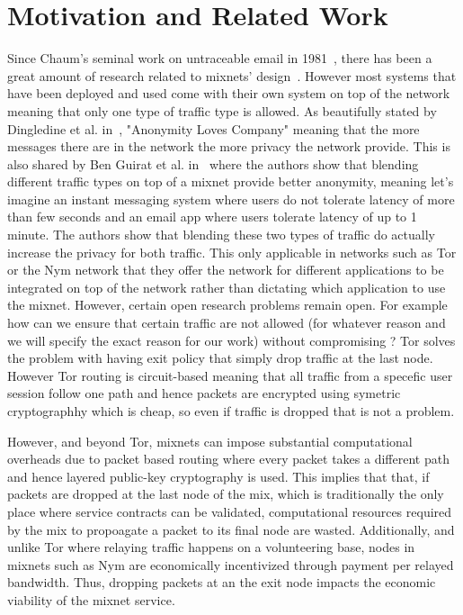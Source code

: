 \section{Motivation and Related Work}
\label{sec:related}

Since Chaum’s seminal work on untraceable email in 1981~\cite{chaum-mix}, there has been a great amount of research related to mixnets' design~\cite{piotrowska2017loopix, van2015vuvuzela, kwon2020xrd, lazar2018karaoke, cottrell1995mixmaster, alexopoulos2017MCMIX, chaum2016cmix, chaum-mix, danezis2003mixminion}. However most systems that have been deployed and used come with their own system on top of the network meaning that only one type of traffic type is allowed. As beautifully stated by Dingledine et al. in~\cite{dingledine2006anonymity}, "Anonymity Loves Company" meaning that the more messages there are in the network the more privacy the network provide. This is also shared by Ben Guirat et al. in~\cite{benguirat2023blending} where the authors show that blending different traffic types on top of a mixnet provide better anonymity, meaning let's imagine an instant messaging system where users do not tolerate latency of more than few seconds and an email app where users tolerate latency of up to 1 minute. The authors show that blending these two types of traffic do actually increase the privacy for both traffic. This only applicable in networks such as Tor or the Nym network that they offer the network for different applications to be integrated on top of the network rather than dictating which application to use the mixnet.
However, certain open research problems remain open. For example how can we ensure that certain traffic are not allowed (for whatever reason and we will specify the exact reason for our work) without compromising ?
Tor solves the problem with having exit policy that simply drop traffic at the last node. However Tor routing is circuit-based meaning that all traffic from a specefic user session follow one path and hence packets are encrypted using symetric cryptographhy which is cheap, so even if traffic is dropped that is not a problem.

However, and beyond Tor, mixnets can impose substantial computational
overheads due to packet based routing where every packet takes a different
path and hence layered public-key cryptography is used. This implies that
that, if packets are dropped at the last node of the mix, which is
traditionally the only place where service contracts can be validated,
computational resources required by the mix to propoagate a packet to its
final node are wasted. Additionally, and unlike Tor where relaying traffic
happens on a volunteering base, nodes in mixnets such as Nym are
economically incentivized through payment per relayed bandwidth. Thus,
dropping packets at an the exit node impacts the economic viability of the
mixnet service.

